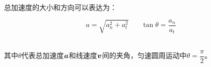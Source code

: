\documentclass[UTF8]{ctexart}
\newcommand*{\veb}[1]{\vb*{#1}}
\begin{document}
    总加速度的大小和方向可以表达为：
    \begin{large}
        \begin{equation*}
            a=\sqrt{a_n^2+a_t^2}~~~~~~~~\tan{\theta}=\frac{a_n}{a_t}
        \end{equation*}
    \end{large}\\
    其中$\theta$代表总加速度$\veb{a}$和线速度$\veb{v}$间的夹角，匀速圆周运动中$\theta=\dfrac{\pi}{2}$。

\newpage









\end{document}
